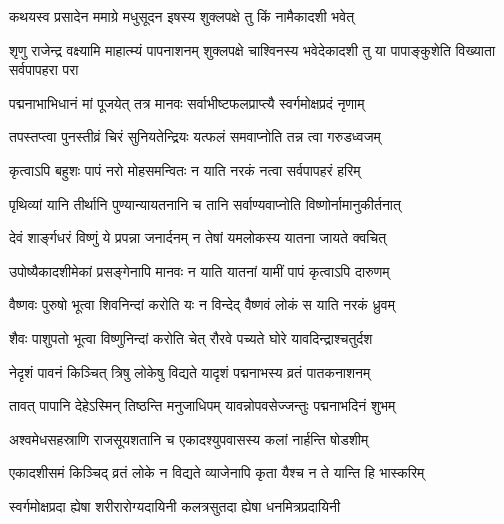 \label{sec:padma-ashvina-shukla-pashankusha}

\ganapatyadiDhyanam
\padmaPuranam



\twolineshloka
{कथयस्व प्रसादेन ममाग्रे मधुसूदन}
{इषस्य शुक्लपक्षे तु किं नामैकादशी भवेत्}%


\threelineshloka
{शृणु राजेन्द्र वक्ष्यामि माहात्म्यं पापनाशनम्}
{शुक्लपक्षे चाश्विनस्य भवेदेकादशी तु या}%
{पापाङ्कुशेति विख्याता सर्वपापहरा परा}

\twolineshloka
{पद्मनाभाभिधानं मां पूजयेत् तत्र मानवः}%
{सर्वाभीष्टफलप्राप्त्यै स्वर्गमोक्षप्रदं नृणाम्}

\twolineshloka
{तपस्तप्त्वा पुनस्तीव्रं चिरं सुनियतेन्द्रियः}%
{यत्फलं समवाप्नोति तन्न त्वा गरुडध्वजम्}

\twolineshloka
{कृत्वाऽपि बहुशः पापं नरो मोहसमन्वितः}%
{न याति नरकं नत्वा सर्वपापहरं हरिम्}

\twolineshloka
{पृथिव्यां यानि तीर्थानि पुण्यान्यायतनानि च}%
{तानि सर्वाण्यवाप्नोति विष्णोर्नामानुकीर्तनात्}

\twolineshloka
{देवं शार्ङ्गधरं विष्णुं ये प्रपन्ना जनार्दनम्}%
{न तेषां यमलोकस्य यातना जायते क्वचित्}

\threelineshloka
{उपोष्यैकादशीमेकां प्रसङ्गेनापि मानवः}
{न याति यातनां यामीं पापं कृत्वाऽपि दारुणम्}%

\twolineshloka
{वैष्णवः पुरुषो भूत्वा शिवनिन्दां करोति यः}
{न विन्देद् वैष्णवं लोकं स याति नरकं ध्रुवम्}%

\twolineshloka
{शैवः पाशुपतो भूत्वा विष्णुनिन्दां करोति चेत्}
{रौरवे पच्यते घोरे यावदिन्द्राश्चतुर्दश}%

\twolineshloka
{नेदृशं पावनं किञ्चित् त्रिषु लोकेषु विद्यते}
{यादृशं पद्मनाभस्य व्रतं पातकनाशनम्}%

\twolineshloka
{तावत् पापानि देहेऽस्मिन् तिष्ठन्ति मनुजाधिपम्}
{यावन्नोपवसेज्जन्तुः पद्मनाभदिनं शुभम्}%

\twolineshloka
{अश्वमेधसहस्राणि राजसूयशतानि च}
{एकादश्युपवासस्य कलां नार्हन्ति षोडशीम्}%

\twolineshloka
{एकादशीसमं किञ्चिद् व्रतं लोके न विद्यते}
{व्याजेनापि कृता यैश्च न ते यान्ति हि भास्करिम्}%

\twolineshloka
{स्वर्गमोक्षप्रदा ह्येषा शरीरारोग्यदायिनी}
{कलत्रसुतदा ह्येषा धनमित्रप्रदायिनी}%

